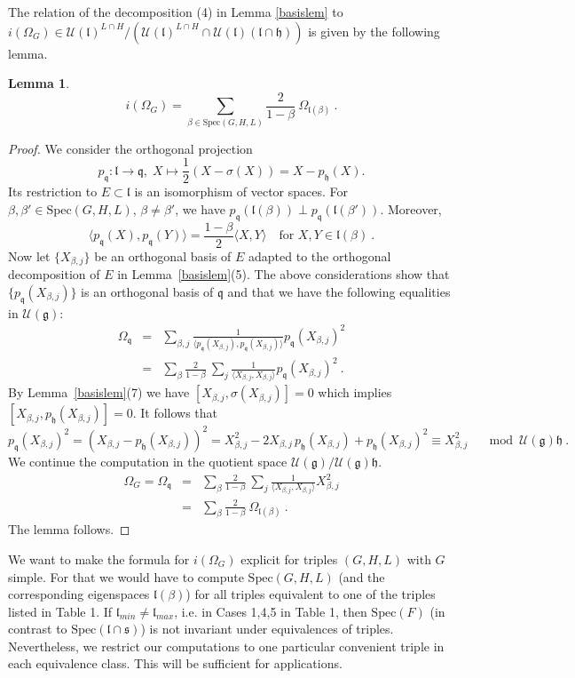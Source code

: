 \documentclass[10]{amsart}
\newtheorem{lem}[thm]{Lemma}
\theoremstyle{remark}
\theoremstyle{definition}
\numberwithin{equation}{section}
\newcommand{\fg}{{\mathfrak g}}
\newcommand{\fh}{{\mathfrak h}}
\newcommand{\fl}{{\mathfrak l}}
\newcommand{\fq}{{\mathfrak q}}
\newcommand{\fs}{{\mathfrak s}}
\newcommand{\Cal}{\mathcal}
\newcommand{\beu}{\begin{equation*}}
\begin{document}
{The relation of the decomposition (4) in Lemma \ref{basislem} to $i(\Omega_G)\in {\mathcal U}(\fl)^{L\cap H}/({\Cal U}(\fl)^{L\cap H}\cap {\Cal U}(\fl)(\fl\cap \fh))$ is 
given by the following lemma.
\begin{lem}\label{sense}
$$ i(\Omega_G)=\sum_{\beta\in \mathrm{Spec}(G,H,L)} \frac{2}{1-\beta}\: \Omega_{\fl(\beta)}\ .$$
\end{lem}
\begin{proof} 
We consider the orthogonal projection
%
\beu
p_{\fq}:\fl\rightarrow\fq,\;X\mapsto\frac{1}{2}(X-\sigma(X))=X-p_\fh(X).
\end{equation*}
%
Its restriction to $E\subset \fl$ is an isomorphism of vector spaces. For $\beta,\beta'\in \mathrm{Spec}(G,H,L)$, $\beta\ne\beta'$, we have $p_\fq(\fl(\beta))\perp p_\fq(\fl(\beta'))$.
Moreover,
$$ \langle p_\fq(X),p_\fq(Y)\rangle=\frac{1-\beta}{2}\langle X,Y\rangle\quad\mbox{for }X,Y\in\fl(\beta)\ .$$
Now let $\{X_{\beta,j}\}$ be an orthogonal basis of $E$ adapted to the orthogonal decomposition of $E$ in Lemma~\ref{basislem}(5).
The above considerations show that $\{p_\fq(X_{\beta,j})\}$ is an orthogonal basis of $\fq$ and that we have the following equalities in ${\Cal U}(\fg)$:
\begin{eqnarray*}
 \Omega_\fq&=&\sum_{\beta,j} \frac{1}{\langle p_\fq(X_{\beta,j}), p_\fq(X_{\beta,j})\rangle} p_\fq(X_{\beta,j})^2\\
&=& \sum_\beta \frac{2}{1-\beta}\:\sum_j \frac{1}{\langle X_{\beta,j},X_{\beta,j}\rangle} p_\fq(X_{\beta,j})^2\ .
\end{eqnarray*}
By Lemma~\ref{basislem}(7) we have $[X_{\beta,j},\sigma (X_{\beta,j})]=0$ which implies $[X_{\beta,j},p_\fh(X_{\beta,j})]=0$.
It follows that
$$ p_\fq(X_{\beta,j})^2=(X_{\beta,j}-p_\fh(X_{\beta,j}))^2=X_{\beta,j}^2-2 X_{\beta,j}\,p_\fh(X_{\beta,j})+p_\fh(X_{\beta,j})^2
\equiv X_{\beta,j}^2\quad \mod {\Cal U}(\fg)\fh\ .$$
We continue the computation in the quotient space  ${\Cal U}(\fg)/{\Cal U}(\fg)\fh$.
\begin{eqnarray*}
\Omega_G=\Omega_\fq
&=& \sum_\beta \frac{2}{1-\beta}\:\sum_j \frac{1}{\langle X_{\beta,j},X_{\beta,j}\rangle}X_{\beta,j}^2\\
&=&  \sum_\beta \frac{2}{1-\beta} \: \Omega_{\fl(\beta)}\ .
\end{eqnarray*}
The lemma follows.
\end{proof}
%
We want to make the formula for $i(\Omega_G)$ explicit for triples $(G,H,L)$ with $G$ simple. For that we would have to compute $\mathrm{Spec}(G,H,L)$
(and the corresponding eigenspaces $\fl(\beta)$) for all triples equivalent to one of the triples listed in Table 1. If $\fl_{min}\ne\fl_{max}$, i.e. in Cases 1,4,5 in Table 1, then
$\mathrm{Spec}(F)$ (in contrast to $ \mathrm{Spec}(\fl\cap\fs)$) is not invariant under equivalences of triples. Nevertheless, we restrict our computations to one particular convenient triple in each equivalence class. This will be sufficient for applications.

}
\end{document}
